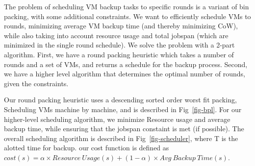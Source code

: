 %
%
%

The problem of scheduling VM backup tasks to specific rounds is a variant of
bin packing, with some additional constraints. We want to efficiently schedule
VMs to rounds, minimizing average VM backup time (and thereby minimizing CoW),
while also taking into account resource usage and total jobspan (which are
minimized in the single round schedule). We solve the problem with a 2-part
algorithm. First, we have a round packing heuristic which takes a number of
rounds and a set of VMs, and returns a schedule for the backup process. Second,
we have a higher level algorithm that determines the optimal number of rounds,
given the constraints.

Our round packing heuristic uses a descending sorted order worst fit packing, 
Scheduling VMs machine by machine, and is described in Fig~\ref{fig-bpl}.
For our higher-level scheduling algorithm, we minimize Resource usage and average
backup time, while ensuring that the jobspan constaint is met (if possible). The
overall scheduling algorithm is described in Fig~\ref{fig-scheduler}, where T is
the alotted time for backup. our cost function is defined as
$cost(s) = \alpha\times Resource~Usage(s) + (1-\alpha)\times Avg~Backup~Time(s)$.




